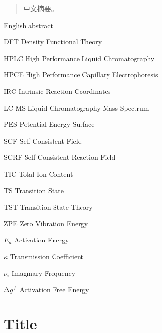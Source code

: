\documentclass[degree=doctor,language=english]{thuthesis}
\begin{document}
\START
\showoutput

\begin{committee}
\end{committee}

\frontmatter

\begin{abstract}
  中文摘要。
\end{abstract}

\begin{abstract*}
  English abstract.
\end{abstract*}

\tableofcontents

\listoffiguresandtables

\begin{denotation}
  \item[DFT] Density Functional Theory
  \item[HPLC] High Performance Liquid Chromatography
  \item[HPCE] High Performance Capillary Electrophoresis
  \item[IRC] Intrinsic Reaction Coordinates
  \item[LC-MS] Liquid Chromatography-Mass Spectrum
  \item[PES] Potential Energy Surface
  \item[SCF] Self-Consistent Field
  \item[SCRF] Self-Consistent Reaction Field
  \item[TIC] Total Ion Content
  \item[TS] Transition State
  \item[TST] Transition State Theory
  \item[ZPE] Zero Vibration Energy
  \item[$E_a$] Activation Energy
  \item[$\kappa$] Transmission Coefficient
  \item[$\nu_i$] Imaginary Frequency
  \item[$\increment g^\neq$] Activation Free Energy
\end{denotation}

\mainmatter

\chapter{Title}
\end{document}

